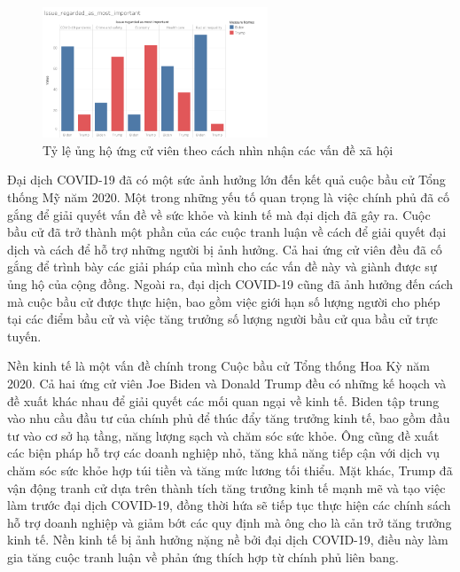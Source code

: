 \documentclass[14pt, a4paper]{article}
\numberwithin{equation}{section}
\numberwithin{figure}{section}
\numberwithin{dl}{section}
\numberwithin{md}{section}
\numberwithin{bd}{section}
\numberwithin{dn}{section}
\numberwithin{hq}{section}
\begin{document}
    \begin{figure}[h!]
        \centering
        \includegraphics[width=0.6\textwidth]{figures/Issue_regarded_as_most_important.png}
        \caption{Tỷ lệ ủng hộ ứng cử viên theo cách nhìn nhận các vấn đề xã hội}
    \end{figure}


    Đại dịch COVID-19 đã có một sức ảnh hưởng lớn đến kết quả cuộc bầu cử Tổng thống Mỹ năm 2020. 
    Một trong những yếu tố quan trọng là việc chính phủ đã cố gắng để giải quyết vấn đề về sức khỏe và kinh tế mà đại dịch đã gây ra.
    Cuộc bầu cử đã trở thành một phần của các cuộc tranh luận về cách để giải quyết đại dịch và cách để hỗ trợ những người bị ảnh hưởng. 
    Cả hai ứng cử viên đều đã cố gắng để trình bày các giải pháp của mình cho các vấn đề này và giành được sự ủng hộ của cộng đồng.
    Ngoài ra, đại dịch COVID-19 cũng đã ảnh hưởng đến cách mà cuộc bầu cử được thực hiện, bao gồm việc giới hạn số lượng người cho phép tại các điểm bầu cử và việc tăng trưởng số lượng người bầu cử qua bầu cử trực tuyến.

    Nền kinh tế là một vấn đề chính trong Cuộc bầu cử Tổng thống Hoa Kỳ năm 2020. 
    Cả hai ứng cử viên Joe Biden và Donald Trump đều có những kế hoạch và đề xuất khác nhau để giải quyết các mối quan ngại về kinh tế. 
    Biden tập trung vào nhu cầu đầu tư của chính phủ để thúc đẩy tăng trưởng kinh tế, bao gồm đầu tư vào cơ sở hạ tầng, năng lượng sạch và chăm sóc sức khỏe. 
    Ông cũng đề xuất các biện pháp hỗ trợ các doanh nghiệp nhỏ, tăng khả năng tiếp cận với dịch vụ chăm sóc sức khỏe hợp túi tiền và tăng mức lương tối thiểu. 
    Mặt khác, Trump đã vận động tranh cử dựa trên thành tích tăng trưởng kinh tế mạnh mẽ và tạo việc làm trước đại dịch COVID-19, đồng thời hứa sẽ tiếp tục thực hiện các chính sách hỗ trợ doanh nghiệp và giảm bớt các quy định mà ông cho là cản trở tăng trưởng kinh tế. 
    Nền kinh tế bị ảnh hưởng nặng nề bởi đại dịch COVID-19, điều này làm gia tăng cuộc tranh luận về phản ứng thích hợp từ chính phủ liên bang.
\end{document}
